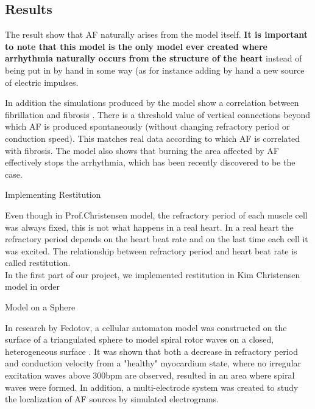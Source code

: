 \documentclass[twocolumn, a1paper, 12pt]{article}
\begin{document}
\subsection{Results}

The result show that AF naturally arises from the model itself.
\textbf{ It is important to note that this model is the only model ever created where arrhythmia naturally occurs from the structure of the heart} instead of being put in by hand in some way (as for instance adding by hand a new source of electric impulses. 
 



 In addition the simulations produced by the model show a correlation between fibrillation and fibrosis .
There is a threshold value of vertical connections beyond which AF is produced spontaneously (without changing refractory period or conduction speed). This matches real data according to which AF is correlated with fibrosis. 
The model also shows that burning the area affected by AF effectively stops the arrhythmia, which has been recently discovered to be the case. 








\begin{block}{Implementing Restitution }

Even though in Prof.Christensen model, the refractory period of each muscle cell was always fixed, this is not what happens in a real heart.
In a real heart the refractory period depends on the heart beat rate and on the last time each cell it was excited. The relationship between refractory period and heart beat rate is called restitution.
\\
In the first part of our project, we implemented restitution in Kim Christensen model in order

\end{block}



\begin{block}{Model on a Sphere}



In research by Fedotov, a cellular automaton model was constructed on the surface of a triangulated sphere to model spiral rotor waves on a closed, heterogeneous surface \cite{Fedotov}. It was shown that both a decrease in refractory period and conduction velocity from a "healthy" myocardium state, where no irregular excitation waves above 300bpm are observed, resulted in an area where spiral waves were formed. In addition, a multi-electrode system was created to study the localization of AF sources by simulated electrograms. 


\end{block}
\end{document}
